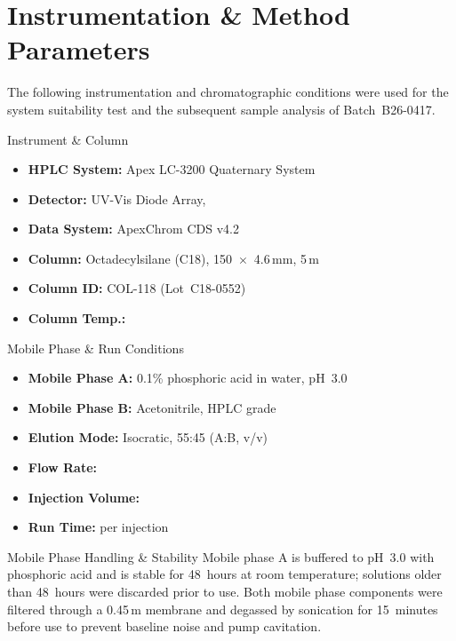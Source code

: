 \section{Instrumentation \& Method Parameters}

The following instrumentation and chromatographic conditions were used for the system suitability test and the subsequent sample analysis of Batch~B26-0417.

\vspace{4pt}
\begin{minipage}[t]{0.49\textwidth}
\vspace{0pt}
\begin{settingsbox}{Instrument \& Column}
\small\renewcommand{\arraystretch}{1.0}%
\begin{itemize}[leftmargin=1.0em,itemsep=1.5pt]
  \item \textbf{HPLC System:} Apex LC-3200 Quaternary System
  \item \textbf{Detector:} UV-Vis Diode Array, 
  \item \textbf{Data System:} ApexChrom CDS v4.2
  \item \textbf{Column:} Octadecylsilane (C18), 150~$\times$~4.6\,mm, 5\,\textmu m
  \item \textbf{Column ID:} COL-118 (Lot~C18-0552)
  \item \textbf{Column Temp.:} 
\end{itemize}
\end{settingsbox}
\end{minipage}%
\hfill%
\begin{minipage}[t]{0.49\textwidth}
\vspace{0pt}
\begin{settingsbox}{Mobile Phase \& Run Conditions}
\small\renewcommand{\arraystretch}{1.0}%
\begin{itemize}[leftmargin=1.0em,itemsep=1.5pt]
  \item \textbf{Mobile Phase A:} 0.1\% phosphoric acid in water, pH~3.0
  \item \textbf{Mobile Phase B:} Acetonitrile, HPLC grade
  \item \textbf{Elution Mode:} Isocratic, 55:45 (A:B, v/v)
  \item \textbf{Flow Rate:} 
  \item \textbf{Injection Volume:} 
  \item \textbf{Run Time:}  per injection
\end{itemize}
\end{settingsbox}
\end{minipage}

\par\vspace{4pt}
\begin{warningbox}{Mobile Phase Handling \& Stability}
\small
Mobile phase A is buffered to pH~3.0 with phosphoric acid and is stable for 48~hours at room temperature; solutions older than 48~hours were discarded prior to use. Both mobile phase components were filtered through a 0.45\,\textmu m membrane and degassed by sonication for 15~minutes before use to prevent baseline noise and pump cavitation.
\end{warningbox}
